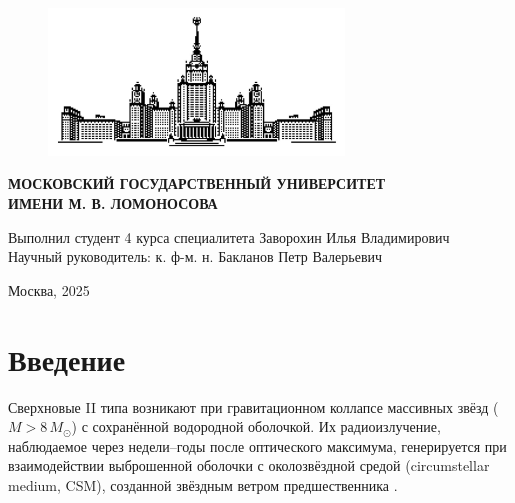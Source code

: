 \documentclass[a4paper,12pt]{extarticle}
\begin{document}
\begin{titlepage} 
    \begin{figure}[!htb]
	\centering
	\includegraphics[width=0.7\textwidth]{Sketch_MSU.jpg}
	\label{fig:Sketch_MSU}
    \end{figure}
    \begin{center}
    \textbf{\Large  МОСКОВСКИЙ ГОСУДАРСТВЕННЫЙ УНИВЕРСИТЕТ \\
ИМЕНИ М. В. ЛОМОНОСОВА} 
    \end{center}
    \begin{center}
    \end{center}
    \begin{center}
    \end{center}
    \begin{center}
    \end{center}
    \vspace{6cm}
    \begin{flushright}
    Выполнил студент 4 курса специалитета Заворохин Илья Владимирович\\
    Научный руководитель: к. ф-м. н. Бакланов Петр Валерьевич
    \end{flushright}
    \vspace{1cm}
    \begin{center}
        Москва, 2025
    \end{center}
\end{titlepage} 

\tableofcontents

\newpage

\section{Введение}

Сверхновые II типа возникают при гравитационном коллапсе массивных звёзд ($M > 8\,M_\odot$) с сохранённой водородной оболочкой. Их радиоизлучение, наблюдаемое через недели–годы после оптического максимума, генерируется при взаимодействии выброшенной оболочки с околозвёздной средой (circumstellar medium, CSM), созданной звёздным ветром предшественника \cite{chevalier1998}.
\end{document}
